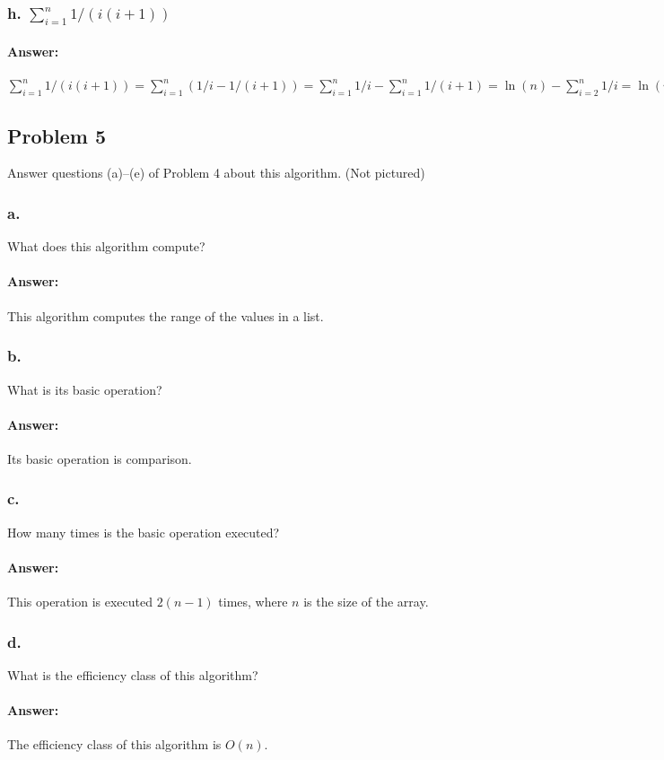 \documentclass{article}
\begin{document}
  \subsubsection{h. $\sum\limits_{i=1}^{n} 1/(i(i+1))$}
    \paragraph{Answer:}
      $\sum\limits_{i=1}^{n} 1/(i(i+1)) = \sum\limits_{i=1}^{n}(1/i - 1/(i+1)) = \sum\limits_{i=1}^{n}1/i - \sum\limits_{i=1}^{n}1/(i+1)
      = \ln(n) - \sum\limits_{i=2}^{n}1/i = \ln(n) - (\sum\limits_{i=1}^{n}1/i - \sum\limits_{i=1}^1 \ln(n) - (ln(n) - 1) = 1$
  \subsection{Problem 5}
    Answer questions (a)–(e) of Problem 4 about this algorithm. (Not pictured)
    \subsubsection{a.}
      What does this algorithm compute?
      \paragraph{Answer:}
        This algorithm computes the range of the values in a list.
    \subsubsection{b.}
      What is its basic operation?
      \paragraph{Answer:}
        Its basic operation is comparison.
    \subsubsection{c.}
      How many times is the basic operation executed?
      \paragraph{Answer:}
      This operation is executed $2(n-1)$ times, where $n$ is the size of the array.
    \subsubsection{d.}
      What is the efficiency class of this algorithm?
      \paragraph{Answer:}
      The efficiency class of this algorithm is $O(n)$.
\end{document}
